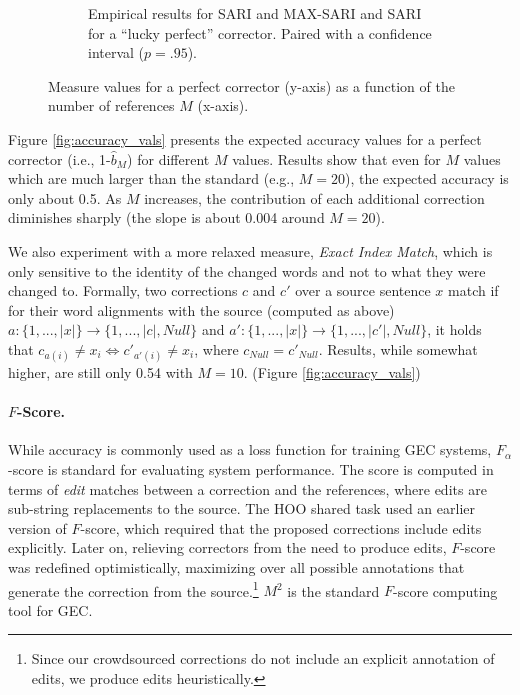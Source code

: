 \documentclass[letterpaper, 11pt]{article}
\newcommand{\lc}[1]{\footnote{\color{blue}LC: #1}}
\begin{document}
\begin{figure}
\begin{subfigure}[]{0.65\columnwidth}
		\caption{
			Empirical results for SARI and MAX-SARI and SARI for a ``lucky perfect'' corrector. Paired with a confidence interval ($p=.95$).\label{fig:SARI_Ms}}
	\end{subfigure}
	\caption{Measure values for a perfect corrector (y-axis)
		as a function of the number of references $M$ (x-axis).}
	\vspace{-0.5cm}
\end{figure}

Figure \ref{fig:accuracy_vals} presents the expected accuracy values for a perfect
corrector (i.e., 1-$\hat{b}_M$) for different  $M$ values. 
Results show that even for $M$ values which are much larger than the standard (e.g., $M=20$),
the expected accuracy is only about 0.5. As $M$ increases, the contribution of each additional correction 
diminishes sharply (the slope is about 0.004 around $M=20$).

We also experiment with a more relaxed measure, {\it Exact Index Match}, which is only sensitive to the identity of the changed words and not to what they were changed to. 
Formally, two corrections $c$ and $c'$ over a source sentence $x$ match if for their word alignments with the source (computed as above) $a:\{1,...,\left|x\right|\} \rightarrow \{1,...,\left|c\right|,Null\}$
and $a':\{1,...,\left|x\right|\} \rightarrow \{1,...,\left|c'\right|,Null\}$, it holds that $c_{a\left(i\right)} \neq x_{i} \Leftrightarrow c'_{a'\left(i\right)} \neq x_{i}$, where $c_{Null}=c'_{Null}$.
Results, while somewhat higher, are still only 0.54 with $M=10$. (Figure \ref{fig:accuracy_vals})

\paragraph{$F$-Score.}
While accuracy is commonly used as a loss function for training GEC systems,
$F_\alpha$-score is standard for evaluating system performance.%
The score is computed in terms of {\it edit} matches between a correction and the references, where edits are sub-string replacements to the source.
The HOO shared task used an earlier version of $F$-score, which required that the proposed corrections include edits explicitly.
Later on, relieving correctors from the need to produce edits, $F$-score was redefined optimistically, maximizing over all possible annotations that generate the correction from the source.\footnote{Since our crowdsourced corrections
	do not include an explicit annotation of edits, we produce edits heuristically.}
$M^2$ \cite{dahlmeier2012better} is the standard $F$-score computing tool for GEC.
\end{document}
